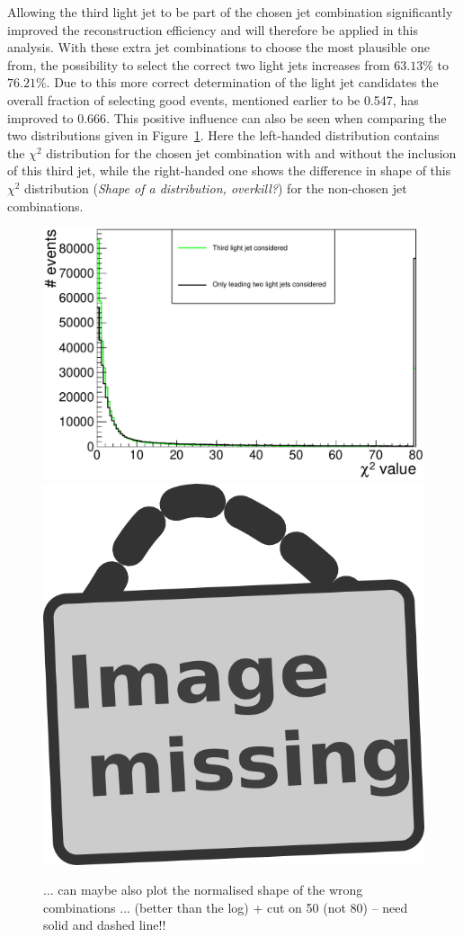 Allowing the third light jet to be part of the chosen jet combination significantly improved the reconstruction efficiency and will therefore be applied in this analysis.
With these extra jet combinations to choose the most plausible one from, the possibility to select the correct two light jets increases from $63.13 \%$ to $76.21 \%$.
Due to this more correct determination of the light jet candidates the overall fraction of selecting good events, mentioned earlier to be 0.547, has improved to $0.666$.
This positive influence can also be seen when comparing the two distributions given in Figure~\ref{fig::ChiSq_4vs5Jets}. 
Here the left-handed distribution contains the $\chi^{2}$ distribution for the chosen jet combination with and without the inclusion of this third jet, while the right-handed one shows the difference in shape of this $\chi^{2}$ distribution (\textit{Shape of a distribution, overkill?}) for the non-chosen jet combinations.
\begin{figure}[h!t]
 \centering
 \includegraphics[width = 0.45 \textwidth]{Chapters/Chapter4_EvtSel/Figures/ChosenChiSqDistr_4vs5Jets.pdf}
 \includegraphics[width = 0.35 \textwidth]{image.png}    %
 \caption{... can maybe also plot the normalised shape of the wrong combinations ... (better than the log) + cut on 50 (not 80) -- need solid and dashed line!!} \label{fig::ChiSq_4vs5Jets}
\end{figure}

